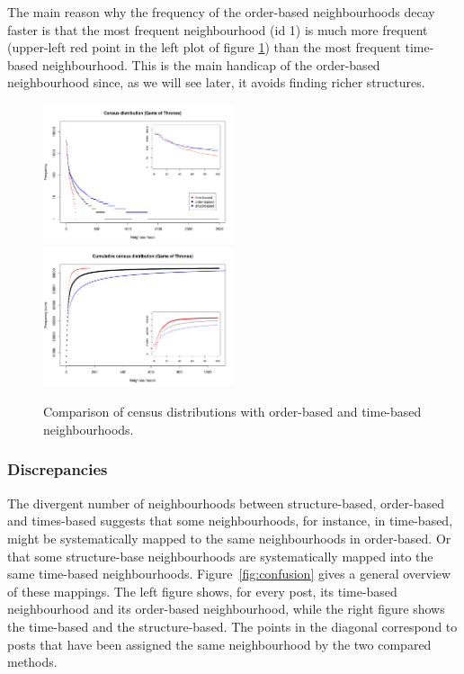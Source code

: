 \documentclass[conference]{IEEEtran}
\begin{document}
The main reason why the frequency of the order-based neighbourhoods decay faster is that the most frequent neighbourhood (id 1) is much more frequent (upper-left red point in the left plot of figure \ref{fig:census_distributions}) than the most frequent time-based neighbourhood. This is the main handicap of the order-based neighbourhood since, as we will see later, it avoids finding richer structures.

\begin{figure}
\centering
\includegraphics[width=0.5\textwidth]{compare_census_distribution_gameofthones}%
\includegraphics[width=0.5\textwidth]{compare_census_distribution_gameofthones_cum}
\caption{Comparison of census distributions with order-based and time-based neighbourhoods.}
\label{fig:census_distributions}
\end{figure}

\subsubsection{Discrepancies}
The divergent number of neighbourhoods between structure-based, order-based and times-based suggests that some neighbourhoods, for instance, in time-based, might be systematically mapped to the same neighbourhoods in order-based. Or that some structure-base neighbourhoods are systematically mapped into the same time-based neighbourhoods. Figure~\ref{fig:confusion} gives a general overview of these mappings. The left figure shows, for every post, its time-based neighbourhood and its order-based neighbourhood, while the right figure shows the time-based and the structure-based. The points in the diagonal correspond to posts that have been assigned the same neighbourhood by the two compared methods. 
\end{document}
